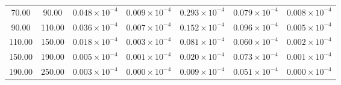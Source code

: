 \begin{tabular}{|c|c||c|c|c|c|c|}
   70.00 &   90.00 & $0.048 \times 10^{-4}$ &  $0.009 \times 10^{-4}$ & $0.293 \times 10^{-4}$ & $0.079 \times 10^{-4}$ & $0.008 \times 10^{-4}$ \\ 
   90.00 &  110.00 & $0.036 \times 10^{-4}$ &  $0.007 \times 10^{-4}$ & $0.152 \times 10^{-4}$ & $0.096 \times 10^{-4}$ & $0.005 \times 10^{-4}$ \\ 
  110.00 &  150.00 & $0.018 \times 10^{-4}$ &  $0.003 \times 10^{-4}$ & $0.081 \times 10^{-4}$ & $0.060 \times 10^{-4}$ & $0.002 \times 10^{-4}$ \\ 
  150.00 &  190.00 & $0.005 \times 10^{-4}$ &  $0.001 \times 10^{-4}$ & $0.020 \times 10^{-4}$ & $0.073 \times 10^{-4}$ & $0.001 \times 10^{-4}$ \\ 
  190.00 &  250.00 & $0.003 \times 10^{-4}$ &  $0.000 \times 10^{-4}$ & $0.009 \times 10^{-4}$ & $0.051 \times 10^{-4}$ & $0.000 \times 10^{-4}$ \\ 
\hline
\end{tabular}
